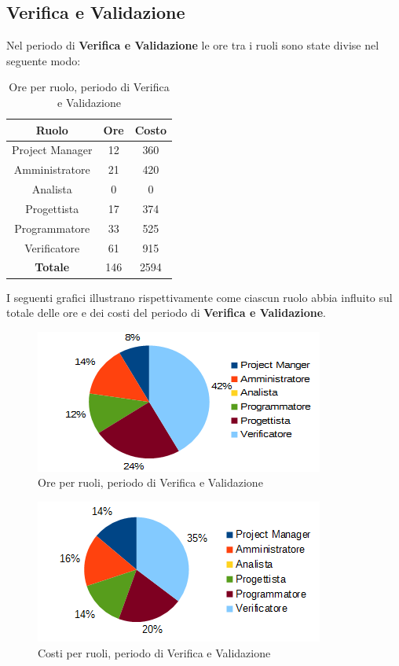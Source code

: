 	\subsection{Verifica e Validazione}
	Nel periodo di \textbf{Verifica e Validazione} le ore tra i ruoli sono state divise nel seguente modo: \\
	\begin{table}[H]
		\centering
		\begin{tabular}{|c|c|c|}
			\hline
			\textbf{Ruolo}		& \textbf{Ore}	& \textbf{Costo} \\
			\hline
			Project Manager		& 12			& 360	\\
			Amministratore		& 21			& 420	\\
			Analista			& 0				& 0	\\
			Progettista			& 17			& 374	\\
			Programmatore		& 33			& 525	\\
			Verificatore		& 61			& 915	\\
			\hline
			\textbf{Totale}		& 146			& 2594	\\
			\hline
		\end{tabular}
		\caption{Ore per ruolo, periodo di Verifica e Validazione}
		\end{table}
	I seguenti grafici illustrano rispettivamente come ciascun ruolo abbia influito sul totale
delle ore e dei costi del periodo di \textbf{Verifica e Validazione}. \\
	\begin{figure}[H]
		\centering
		\includegraphics[scale=1]{immagini/grafici/validazione-torta.png}
		\caption{Ore per ruoli, periodo di Verifica e Validazione}
	\end{figure}
	\begin{figure}[H]
		\centering
		\includegraphics[scale=1]{immagini/grafici/validazione-torta-costo.png}
		\caption{Costi per ruoli, periodo di Verifica e Validazione}
	\end{figure}
